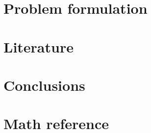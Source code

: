 \documentclass[11pt,oneside]{book}
\theoremstyle{definition}
\begin{document}
    \chapter{Problem formulation}
    

    \chapter{Literature}
    

    \chapter{Conclusions}
    

    \chapter{Math reference}
    

    \nocite{*}
    \printbibliography[title={Bibliography}] 
\end{document}

